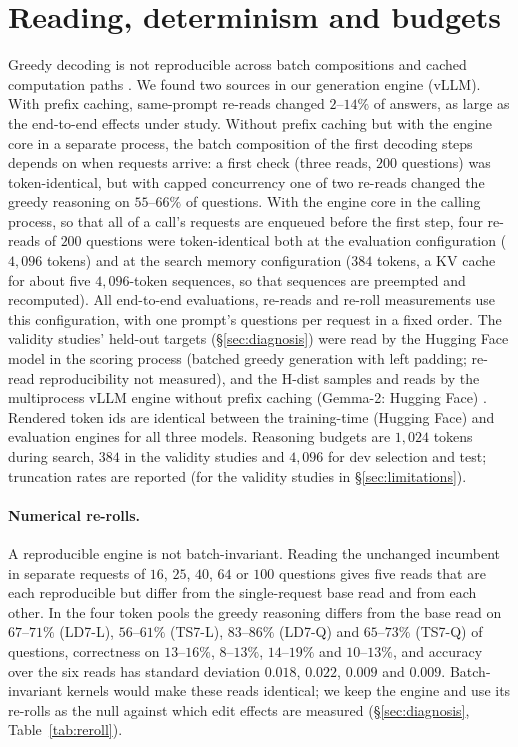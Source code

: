 \section{Reading, determinism and budgets}
\label{app:reader}
Greedy decoding is not reproducible across batch compositions and cached computation paths
\citep{yuan2025nondeterminism,he2025nondeterminism}. We found two sources in our generation
engine (vLLM). With prefix caching, same-prompt re-reads changed $2$--$14\%$ of answers, as large
as the end-to-end effects under study. Without prefix caching but with the engine core in a
separate process, the batch composition of the first decoding steps depends on when requests
arrive: a first check (three reads, $200$ questions) was token-identical, but with capped
concurrency one of two re-reads changed the greedy reasoning on $55$--$66\%$ of questions. With the
engine core in the calling process, so that all of a call's requests are enqueued before the first
step, four re-reads of $200$ questions were token-identical both at the evaluation configuration
($4{,}096$ tokens) and at the search memory configuration ($384$ tokens, a KV cache for about five
$4{,}096$-token sequences, so that sequences are preempted and recomputed). All end-to-end
evaluations, re-reads and re-roll measurements use this configuration, with one prompt's
questions per request in a fixed order. The validity studies' held-out targets
(\S\ref{sec:diagnosis}) were read by the Hugging Face model in the scoring process (batched greedy
generation with left padding; re-read reproducibility not measured), and the H-dist samples and
reads by the multiprocess vLLM engine without prefix caching (Gemma-2: Hugging Face)
. Rendered token
ids are identical between the training-time (Hugging Face) and evaluation engines for all three
models. Reasoning budgets are $1{,}024$ tokens during search, $384$ in the validity studies and
$4{,}096$ for dev selection and test; truncation rates are reported (for the validity studies in
\S\ref{sec:limitations}).

\paragraph{Numerical re-rolls.} A reproducible engine is not batch-invariant. Reading the
unchanged incumbent in separate requests of $16$, $25$, $40$, $64$ or $100$ questions gives five
reads that are each reproducible but differ from the single-request base read and from each other.
In the four token pools the greedy reasoning differs from the base read on $67$--$71\%$ (LD7-L),
$56$--$61\%$ (TS7-L), $83$--$86\%$ (LD7-Q) and $65$--$73\%$ (TS7-Q) of questions, correctness on
$13$--$16\%$, $8$--$13\%$, $14$--$19\%$ and $10$--$13\%$, and accuracy over the six reads has
standard deviation $0.018$, $0.022$, $0.009$ and $0.009$. Batch-invariant kernels
\citep{he2025nondeterminism} would make these reads identical; we keep the engine and use its
re-rolls as the null against which edit effects are measured (\S\ref{sec:diagnosis},
Table~\ref{tab:reroll}).


